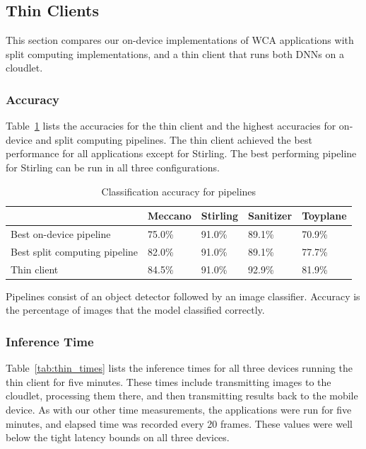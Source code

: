 \subsection{Thin Clients}\label{sec:thin_clients}

This section compares our on-device implementations of WCA applications with
split computing implementations, and a thin client that runs both DNNs on a
cloudlet.

\subsubsection{Accuracy}

Table~\ref{tab:thin_accuracy} lists the accuracies for the thin client and the
highest accuracies for on-device and split computing pipelines.
The thin client achieved the best performance for all applications except for
Stirling.
The best performing pipeline for Stirling can be run in all three
configurations.

\begin{table}
\begin{tabular}{|l||l|l|l|l|}
  \hline
  & Meccano & Stirling & Sanitizer & Toyplane\\
  \hline
  \hline
  Best on-device pipeline & 75.0\% & 91.0\% & 89.1\% & 70.9\%\\
  Best split computing pipeline & 82.0\% & 91.0\% & 89.1\% & 77.7\%\\
  Thin client & 84.5\% & 91.0\% & 92.9\% & 81.9\%\\
  \hline
\end{tabular}
\begin{captiontext}
  Pipelines consist of an object detector followed by an image classifier.
  Accuracy is the percentage of images that the model classified correctly.
\end{captiontext}
  \caption{
    Classification accuracy for pipelines
  }\label{tab:thin_accuracy}
\end{table}

\subsubsection{Inference Time}

Table~\ref{tab:thin_times} lists the inference times for all three devices running
the thin client for five minutes.
These times include transmitting images to the cloudlet, processing them there,
and then transmitting results back to the mobile device.
As with our other time measurements, the applications were run for five minutes,
and elapsed time was recorded every 20 frames.
These values were well below the tight latency bounds on all three devices.

